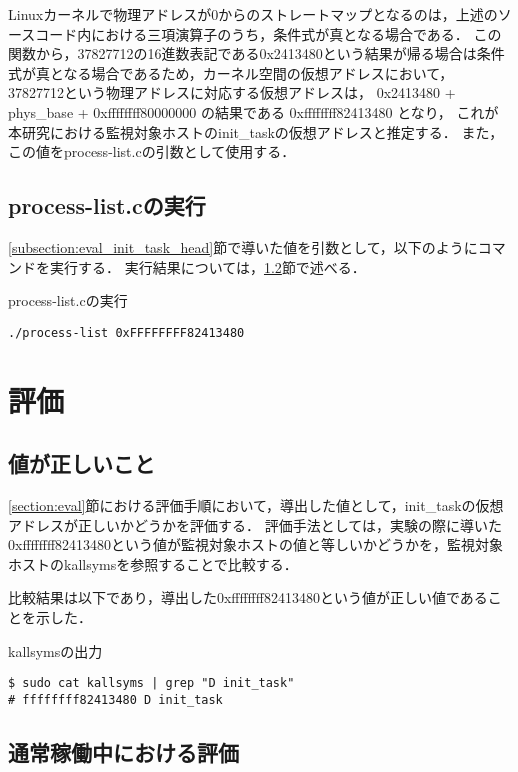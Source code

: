 Linuxカーネルで物理アドレスが0からのストレートマップとなるのは，上述のソースコード内における三項演算子のうち，条件式が真となる場合である．
この関数から，37827712の16進数表記である0x2413480という結果が帰る場合は条件式が真となる場合であるため，カーネル空間の仮想アドレスにおいて，
37827712という物理アドレスに対応する仮想アドレスは， 0x2413480 + phys\_base + 0xffffffff80000000 の結果である 0xffffffff82413480 となり，
これが本研究における監視対象ホストのinit\_taskの仮想アドレスと推定する．
また，この値をprocess-list.cの引数として使用する．

\subsection{process-list.cの実行}

\ref{subsection:eval_init_task_head}節で導いた値を引数として，以下のようにコマンドを実行する．
実行結果については，\ref{subsection:exec_process_list}節で述べる．

\begin{itembox}[l]{process-list.cの実行}
    \begin{verbatim}
./process-list 0xFFFFFFFF82413480
    \end{verbatim}
\end{itembox}

\section{評価}

\subsection{値が正しいこと}

\ref{section:eval}節における評価手順において，導出した値として，init\_taskの仮想アドレスが正しいかどうかを評価する．
評価手法としては，実験の際に導いた0xffffffff82413480という値が監視対象ホストの値と等しいかどうかを，監視対象ホストのkallsymsを参照することで比較する．

比較結果は以下であり，導出した0xffffffff82413480という値が正しい値であることを示した．

\begin{itembox}[l]{kallsymsの出力}
    \begin{verbatim}
$ sudo cat kallsyms | grep "D init_task"
# ffffffff82413480 D init_task
    \end{verbatim}
\end{itembox}

\subsection{通常稼働中における評価}
\label{subsection:exec_process_list}

